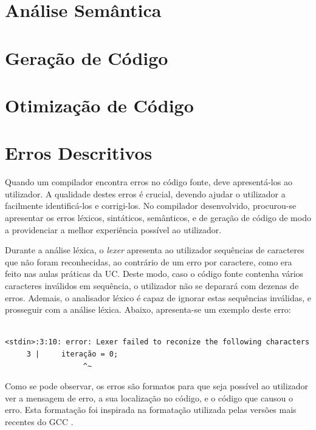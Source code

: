 \documentclass[12pt, a4paper]{article}
\begin{document}
\section{Análise Semântica}

\section{Geração de Código}

\section{Otimização de Código}

\section{Erros Descritivos}

Quando um compilador encontra erros no código fonte, deve apresentá-los ao utilizador. A qualidade
destes erros é crucial, devendo ajudar o utilizador a facilmente identificá-los e corrigi-los. No
compilador desenvolvido, procurou-se apresentar os erros léxicos, sintáticos, semânticos, e de
geração de código de modo a providenciar a melhor experiência possível ao utilizador.

Durante a análise léxica, o \emph{lexer} apresenta ao utilizador sequências de caracteres que não
foram reconhecidas, ao contrário de um erro por caractere, como era feito nas aulas práticas da UC.
Deste modo, caso o código fonte contenha vários caracteres inválidos em sequência, o utilizador não
se deparará com dezenas de erros. Ademais, o analisador léxico é capaz de ignorar estas sequências
inválidas, e prosseguir com a análise léxica. Abaixo, apresenta-se um exemplo deste erro:


\begin{lstlisting}

<stdin>:3:10: error: Lexer failed to reconize the following characters
     3 |     iteração = 0;
                  ^~
\end{lstlisting}

Como se pode observar, os erros são formatos para que seja possível ao utilizador ver a mensagem de
erro, a sua localização no código, e o código que causou o erro. Esta formatação foi inspirada na
formatação utilizada pelas versões mais recentes do GCC \cite{gcc-errors}.
\end{document}
